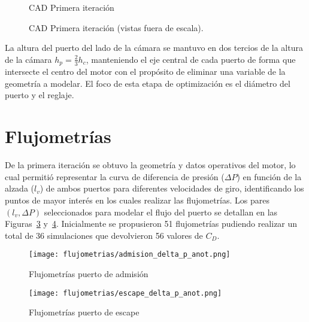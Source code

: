 \begin{figure}[h!]
  \centering
  \caption{CAD Primera iteración}\label{fig:motor_cad1}
\end{figure}


\begin{figure}[h!]
  \centering
  \hfill
  \caption{CAD Primera iteración (vistas fuera de escala).}\label{fig:motor_cad2}
\end{figure}

La altura del puerto del lado de la cámara se mantuvo en dos tercios de la
altura de la cámara $h_{p} = \frac{2}{3}h_{c}$, manteniendo el eje central de cada
puerto de forma que intersecte el centro del motor con el propósito de eliminar
una variable de la geometría a modelar.
%
El foco de esta etapa de optimización es el diámetro del puerto y el reglaje.
%


\section{Flujometrías}

De la primera iteración se obtuvo la geometría y datos operativos del motor, lo
cual permitió representar la curva de diferencia de presión ($\Delta P$) en
función de la alzada ($l_{v}$) de ambos puertos para diferentes velocidades de
giro, identificando los puntos de mayor interés en los cuales realizar las
flujometrías.
%
Los pares $(l_{v}, \Delta P)$ seleccionados para modelar el flujo del puerto se
detallan en las Figuras~\ref{fig:delta_p_admision} y~\ref{fig:delta_p_escape}.
%
Inicialmente se propusieron 51 flujometrías pudiendo realizar un total de 36
simulaciones que devolvieron 56 valores de $C_{D}$.

\begin{figure}[h!]
  \centering
  \texttt{[image: flujometrias/admision\_delta\_p\_anot.png]}
  \caption{Flujometrías puerto de admisión}\label{fig:delta_p_admision}
\end{figure}

\begin{figure}[h!]
  \centering
  \texttt{[image: flujometrias/escape\_delta\_p\_anot.png]}
  \caption{Flujometrías puerto de escape}\label{fig:delta_p_escape}
\end{figure}


